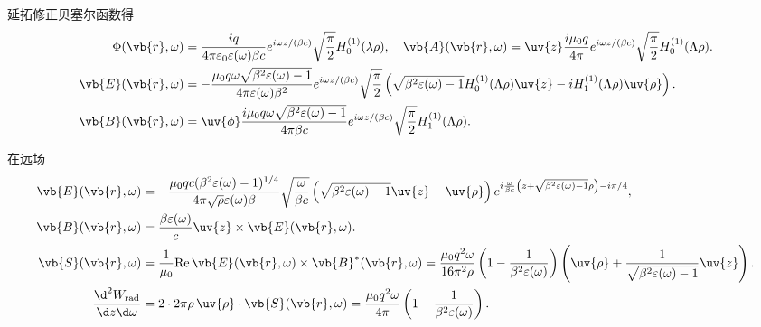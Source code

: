 \begin{example}
	延拓修正贝塞尔函数得
	\begin{align*}
		\Phi(\vb{r},\omega) &= \frac{i q}{4\pi \varepsilon_{0} \varepsilon(\omega) \beta c} e^{i\omega z/(\beta c)} \sqrt{\frac{\pi}{2}} H_{0}^{(1)}(\lambda \rho), \quad
		\vb{A}(\vb{r},\omega) = \uv{z} \frac{i \mu_{0} q}{4\pi} e^{i\omega z/(\beta c)} \sqrt{\frac{\pi}{2}} H_{0}^{(1)}(\Lambda \rho).\\
		\vb{E}(\vb{r},\omega) &= -\frac{\mu_{0} q \omega \sqrt{\beta^{2} \varepsilon(\omega) - 1}}{4\pi \varepsilon(\omega) \beta^{2}} e^{i\omega z/(\beta c)} \sqrt{\frac{\pi}{2}} \left( \sqrt{\beta^{2} \varepsilon(\omega) - 1} H_{0}^{(1)}(\Lambda \rho) \uv{z} - i H_{1}^{(1)}(\Lambda \rho) \uv{\rho} \right).\\
		\vb{B}(\vb{r},\omega) &= \uv{\phi} \frac{i \mu_{0} q \omega \sqrt{\beta^{2} \varepsilon(\omega) - 1}}{4\pi \beta c} e^{i\omega z/(\beta c)} \sqrt{\frac{\pi}{2}} H_{1}^{(1)}(\Lambda \rho).
	\end{align*}

	在远场
	\begin{align*}
		\vb{E}(\vb{r},\omega) &= -\frac{\mu_{0} q c (\beta^{2} \varepsilon(\omega) - 1)^{1/4}}{4\pi \sqrt{\rho} \varepsilon(\omega) \beta} \sqrt{\frac{\omega}{\beta c}} \left( \sqrt{\beta^{2} \varepsilon(\omega) - 1} \uv{z} - \uv{\rho} \right) e^{i\frac{\omega}{\beta c} \left( z + \sqrt{\beta^{2} \varepsilon(\omega) - 1} \rho \right) - i\pi/4}, \\
		\vb{B}(\vb{r},\omega) &= \frac{\beta \varepsilon(\omega)}{c} \uv{z} \times \vb{E}(\vb{r},\omega).\\
		\vb{S}(\vb{r},\omega) &= \frac{1}{\mu_{0}} \mathrm{Re} \, \vb{E}(\vb{r},\omega) \times \vb{B}^{*}(\vb{r},\omega) = \frac{\mu_{0} q^{2} \omega}{16\pi^{2} \rho} \left( 1 - \frac{1}{\beta^{2} \varepsilon(\omega)} \right) \left( \uv{\rho} + \frac{1}{\sqrt{\beta^{2} \varepsilon(\omega) - 1}} \uv{z} \right).\\
		\frac{\d^{2} W_{\mathrm{rad}}}{\d z \d \omega} &= 2 \cdot 2\pi \rho \, \uv{\rho} \cdot \vb{S}(\vb{r},\omega) = \frac{\mu_{0} q^{2} \omega}{4\pi} \left( 1 - \frac{1}{\beta^{2} \varepsilon(\omega)} \right).
	\end{align*}


\end{example}
